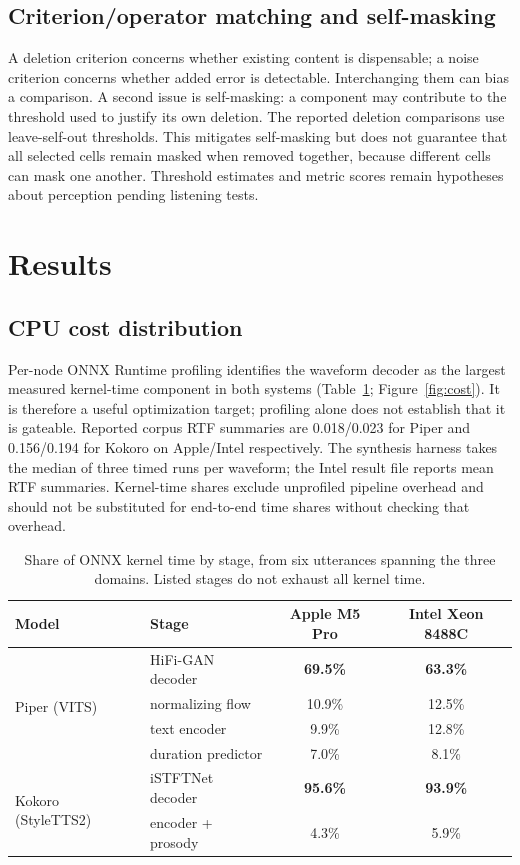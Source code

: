 \documentclass[11pt,a4paper]{article}
\begin{document}
\subsection{Criterion/operator matching and self-masking}
\label{sec:traps}
A deletion criterion concerns whether existing content is dispensable; a noise criterion concerns whether added error is detectable. Interchanging them can bias a comparison. A second issue is self-masking: a component may contribute to the threshold used to justify its own deletion. The reported deletion comparisons use leave-self-out thresholds. This mitigates self-masking but does not guarantee that all selected cells remain masked when removed together, because different cells can mask one another. Threshold estimates and metric scores remain hypotheses about perception pending listening tests.

\section{Results}
\subsection{CPU cost distribution}
\label{sec:rq2}
Per-node ONNX Runtime profiling identifies the waveform decoder as the largest measured kernel-time component in both systems (Table~\ref{tab:rq2}; Figure~\ref{fig:cost}). It is therefore a useful optimization target; profiling alone does not establish that it is gateable. Reported corpus RTF summaries are 0.018/0.023 for Piper and 0.156/0.194 for Kokoro on Apple/Intel respectively. The synthesis harness takes the median of three timed runs per waveform; the Intel result file reports mean RTF summaries. Kernel-time shares exclude unprofiled pipeline overhead and should not be substituted for end-to-end time shares without checking that overhead.


\begin{table}[htbp]
\centering
\caption{Share of ONNX kernel time by stage, from six utterances spanning the three domains. Listed stages do not exhaust all kernel time.}
\label{tab:rq2}
\small
\begin{tabular}{@{}llcc@{}}
\toprule
\textbf{Model} & \textbf{Stage} & \textbf{Apple M5 Pro} & \textbf{Intel Xeon 8488C} \\
\midrule
\multirow{4}{*}{Piper (VITS)} & HiFi-GAN decoder & \textbf{69.5\%} & \textbf{63.3\%} \\
 & normalizing flow & 10.9\% & 12.5\% \\
 & text encoder & 9.9\% & 12.8\% \\
 & duration predictor & 7.0\% & 8.1\% \\
\midrule
\multirow{2}{*}{Kokoro (StyleTTS2)} & iSTFTNet decoder & \textbf{95.6\%} & \textbf{93.9\%} \\
 & encoder + prosody & 4.3\% & 5.9\% \\
\bottomrule
\end{tabular}
\end{table}
\end{document}
